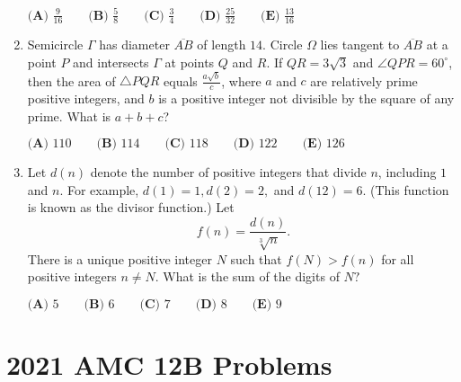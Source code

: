 \documentclass{article}
\begin{document}
\begin{enumerate}[label=\arabic*., itemsep=0.5em]
\(\textbf{(A) }\frac{9}{16} \qquad \textbf{(B) }\frac{5}{8} \qquad \textbf{(C) }\frac34 \qquad \textbf{(D) }\frac{25}{32}\qquad \textbf{(E) }\frac{13}{16}\)\par \vspace{0.5em}\item Semicircle \(\Gamma\) has diameter \(\overline{AB}\) of length \(14\). Circle \(\Omega\) lies tangent to \(\overline{AB}\) at a point \(P\) and intersects \(\Gamma\) at points \(Q\) and \(R\). If \(QR=3\sqrt3\) and \(\angle QPR=60^\circ\), then the area of \(\triangle PQR\) equals \(\tfrac{a\sqrt{b}}{c}\), where \(a\) and \(c\) are relatively prime positive integers, and \(b\) is a positive integer not divisible by the square of any prime. What is \(a+b+c\)?

\(\textbf{(A) }110 \qquad \textbf{(B) }114 \qquad \textbf{(C) }118 \qquad \textbf{(D) }122\qquad \textbf{(E) }126\)\par \vspace{0.5em}\item Let \(d(n)\) denote the number of positive integers that divide \(n\), including \(1\) and \(n\). For example, \(d(1)=1,d(2)=2,\) and \(d(12)=6\). (This function is known as the divisor function.) Let
\begin{equation*}
f(n)=\frac{d(n)}{\sqrt [3]n}.
\end{equation*}
There is a unique positive integer \(N\) such that \(f(N)>f(n)\) for all positive integers \(n\ne N\). What is the sum of the digits of \(N?\)

\(\textbf{(A) }5 \qquad \textbf{(B) }6 \qquad \textbf{(C) }7 \qquad \textbf{(D) }8\qquad \textbf{(E) }9\)\par \vspace{0.5em}\end{enumerate}\newpage\section*{2021 AMC 12B Problems}
\end{document}
